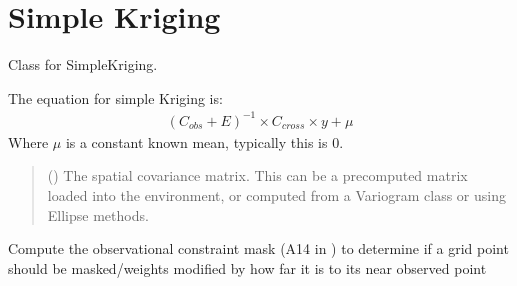 \documentclass[letterpaper,10pt,english]{sphinxmanual}
\begin{document}
\section{Simple Kriging}
\label{\detokenize{kriging:simple-kriging}}

\begin{fulllineitems}
\label{\detokenize{kriging:glomar_gridding.kriging.SimpleKriging}}
\pysigstartsignatures
\pysiglinewithargsret
{}
{}
{}
\pysigstopsignatures
\sphinxAtStartPar
Class for SimpleKriging.

\sphinxAtStartPar
The equation for simple Kriging is:
\begin{equation*}
\begin{split}(C_{obs} + E)^{-1} \times C_{cross} \times y + \mu\end{split}
\end{equation*}
\sphinxAtStartPar
Where \(\mu\) is a constant known mean, typically this is 0.
\begin{quote}\begin{description}
\sphinxAtStartPar
{} () \textendash{} The spatial covariance matrix. This can be a pre\sphinxhyphen{}computed matrix loaded
into the environment, or computed from a Variogram class or using
Ellipse methods.

\end{description}\end{quote}

\begin{fulllineitems}
\label{\detokenize{kriging:glomar_gridding.kriging.SimpleKriging.constraint_mask}}
\pysigstartsignatures
\pysiglinewithargsret
{}
{}
{}
\pysigstopsignatures
\sphinxAtStartPar
Compute the observational constraint mask (A14 in ) to
determine if a grid point should be masked/weights modified by how far
it is to its near observed point


\end{fulllineitems}
\end{fulllineitems}
\end{document}
